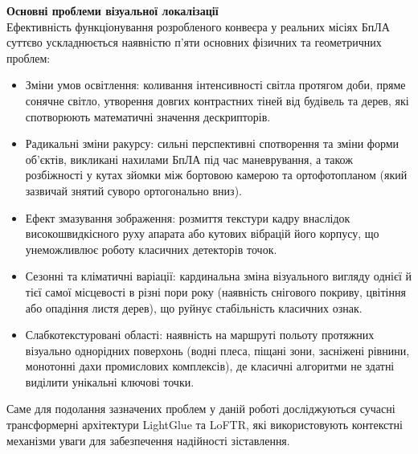 \documentclass[a4paper, 12pt, titlepage]{article}
\begin{document}

\textbf{Основні проблеми візуальної локалізації}\\
Ефективність функціонування розробленого конвеєра у реальних місіях БпЛА суттєво ускладнюється наявністю п'яти основних фізичних та геометричних проблем:
\begin{itemize}
    \item Зміни умов освітлення: коливання інтенсивності світла протягом доби, пряме сонячне світло, утворення довгих контрастних тіней від будівель та дерев, які спотворюють математичні значення дескрипторів.
    \item Радикальні зміни ракурсу: сильні перспективні спотворення та зміни форми об'єктів, викликані нахилами БпЛА під час маневрування, а також розбіжності у кутах зйомки між бортовою камерою та ортофотопланом (який зазвичай знятий суворо ортогонально вниз).
    \item Ефект змазування зображення: розмиття текстури кадру внаслідок високошвидкісного руху апарата або кутових вібрацій його корпусу, що унеможливлює роботу класичних детекторів точок.
    \item Сезонні та кліматичні варіації: кардинальна зміна візуального вигляду однієї й тієї самої місцевості в різні пори року (наявність снігового покриву, цвітіння або опадіння листя дерев), що руйнує стабільність класичних ознак.
    \item Слабкотекстуровані області: наявність на маршруті польоту протяжних візуально однорідних поверхонь (водні плеса, піщані зони, засніжені рівнини, монотонні дахи промислових комплексів), де класичні алгоритми не здатні виділити унікальні ключові точки.
\end{itemize}
Саме для подолання зазначених проблем у даній роботі досліджуються сучасні трансформерні архітектури LightGlue та LoFTR, які використовують контекстні механізми уваги для забезпечення надійності зіставлення.
\end{document}

